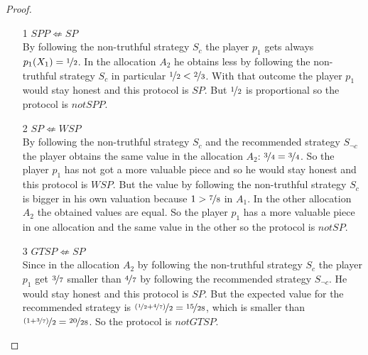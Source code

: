 \begin{proof}
\begin{enumerate}
\item[1] $SPP \not\Leftarrow SP$\\
By following the non-truthful strategy $S_c$ the player $p_1$ gets always $p_1(X_1)=\nicefrac{1}{2}$. In the allocation $A_2$ he obtains less by following the non-truthful strategy $S_c$ in particular $\nicefrac{1}{2} < \nicefrac{2}{3}$. With that outcome the player $p_1$ would stay honest and this protocol is $SP$. But $\nicefrac{1}{2}$ is proportional so the protocol is $notSPP$. 
\item[2] $SP \not\Leftarrow WSP$\\
By following the non-truthful strategy $S_c$ and the recommended strategy $S_{\neg c}$ the player obtains the same value in the allocation $A_2$: $\nicefrac{3}{4} = \nicefrac{3}{4}$. So the player $p_1$ has not got a more valuable piece and so he would stay honest and this protocol is $WSP$. But the value by following the non-truthful strategy $S_c$ is bigger in his own valuation because $1 > \nicefrac{7}{8}$ in $A_1$. In the other allocation $A_2$ the obtained values are equal. So the player $p_1$ has a more valuable piece in one allocation and the same value in the other so the protocol is $notSP$.
\item[3] $GTSP \not\Leftarrow SP$\\
Since in the allocation $A_2$ by following the non-truthful strategy $S_c$ the player $p_1$ get $\nicefrac{3}{7}$ smaller than $\nicefrac{4}{7}$ by following the recommended strategy $S_{\neg c}$. He would stay honest and this protocol is $SP$. But the expected value for the recommended strategy is $\nicefrac{(\nicefrac{1}{2}+\nicefrac{4}{7})}{2}=\nicefrac{15}{28}$, which is smaller than $\nicefrac{(1+\nicefrac{3}{7})}{2}=\nicefrac{20}{28}$. So the protocol is $notGTSP$. 
\end{enumerate}
\end{proof}
